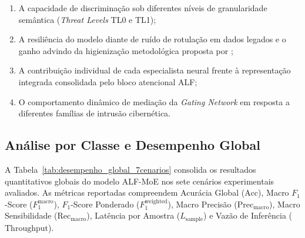 \begin{enumerate}
    \item A capacidade de discriminação sob diferentes níveis de granularidade semântica (\emph{Threat
    Levels} TL0 e TL1);
    \item A resiliência do modelo diante de ruído de rotulação em dados legados e o ganho advindo da
    higienização metodológica proposta por ;
    \item A contribuição individual de cada especialista neural frente à representação integrada
    consolidada pelo bloco atencional ALF;
    \item O comportamento dinâmico de mediação da \emph{Gating Network} em resposta a diferentes
    famílias de intrusão cibernética.
\end{enumerate}

\subsection{Análise por Classe e Desempenho Global}
\label{subsec:analise_classe_global}

A Tabela~\ref{tab:desempenho_global_7cenarios} consolida os resultados quantitativos globais do
modelo ALF-MoE nos sete cenários experimentais avaliados. As métricas reportadas compreendem Acurácia
Global ($\mathrm{Acc}$), Macro $F_1$-Score ($F_1^{\mathrm{macro}}$), $F_1$-Score Ponderado
($F_1^{\mathrm{weighted}}$), Macro Precisão ($\mathrm{Prec}_{\mathrm{macro}}$), Macro Sensibilidade
($\mathrm{Rec}_{\mathrm{macro}}$), Latência por Amostra ($L_{\mathrm{sample}}$) e Vazão de
Inferência ($\mathrm{Throughput}$).


